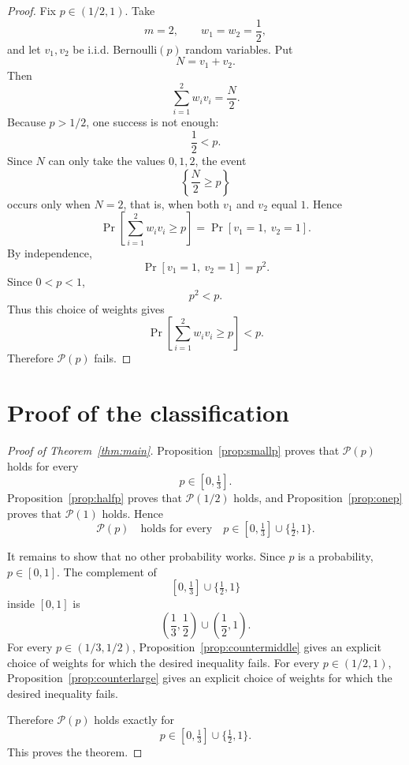 \documentclass[12pt]{article}
\theoremstyle{definition}
\theoremstyle{plain}
\theoremstyle{remark}
\begin{document}
\begin{proof}
Fix \(p\in(1/2,1)\). Take
\[
m=2,\qquad w_1=w_2=\frac12,
\]
and let \(v_1,v_2\) be i.i.d. Bernoulli\((p)\) random variables. Put
\[
N=v_1+v_2.
\]
Then
\[
\sum_{i=1}^{2}w_i v_i=\frac{N}{2}.
\]
Because \(p>1/2\), one success is not enough:
\[
\frac12<p.
\]
Since \(N\) can only take the values \(0,1,2\), the event
\[
\left\{\frac{N}{2}\ge p\right\}
\]
occurs only when \(N=2\), that is, when both \(v_1\) and \(v_2\) equal \(1\). Hence
\[
\Pr\!\left[\sum_{i=1}^{2}w_i v_i\ge p\right]
=
\Pr[v_1=1,\ v_2=1].
\]
By independence,
\[
\Pr[v_1=1,\ v_2=1]=p^2.
\]
Since \(0<p<1\),
\[
p^2<p.
\]
Thus this choice of weights gives
\[
\Pr\!\left[\sum_{i=1}^{2}w_i v_i\ge p\right]<p.
\]
Therefore \(\mathcal P(p)\) fails.
\end{proof}

\section{Proof of the classification}

\begin{proof}[Proof of Theorem~\ref{thm:main}]
Proposition~\ref{prop:smallp} proves that \(\mathcal P(p)\) holds for every
\[
p\in[0,\tfrac13].
\]
Proposition~\ref{prop:halfp} proves that \(\mathcal P(1/2)\) holds, and Proposition~\ref{prop:onep} proves that \(\mathcal P(1)\) holds. Hence
\[
\mathcal P(p)\quad\text{holds for every}\quad
p\in[0,\tfrac13]\cup\{\tfrac12,1\}.
\]

It remains to show that no other probability works. Since \(p\) is a probability, \(p\in[0,1]\). The complement of
\[
[0,\tfrac13]\cup\{\tfrac12,1\}
\]
inside \([0,1]\) is
\[
\left(\frac13,\frac12\right)\cup\left(\frac12,1\right).
\]
For every \(p\in(1/3,1/2)\), Proposition~\ref{prop:countermiddle} gives an explicit choice of weights for which the desired inequality fails. For every \(p\in(1/2,1)\), Proposition~\ref{prop:counterlarge} gives an explicit choice of weights for which the desired inequality fails.

Therefore \(\mathcal P(p)\) holds exactly for
\[
p\in[0,\tfrac13]\cup\{\tfrac12,1\}.
\]
This proves the theorem.
\end{proof}
\end{document}
